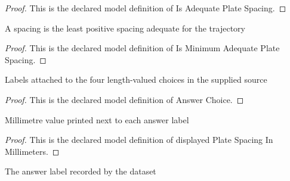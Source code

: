 \begin{proof}
  This is the declared model definition of Is Adequate Plate Spacing.
\end{proof}
\begin{definition}
  \label{def:physics:phyx-mini-0838:phyxminiproblems-problemphyxmini0838-isminimumadequateplatespacing}
  A spacing is the least positive spacing adequate for the trajectory
\end{definition}
\begin{proof}
  This is the declared model definition of Is Minimum Adequate Plate Spacing.
\end{proof}
\begin{definition}
  \label{def:physics:phyx-mini-0838:phyxminiproblems-problemphyxmini0838-answerchoice}
  Labels attached to the four length-valued choices in the supplied source
\end{definition}
\begin{proof}
  This is the declared model definition of Answer Choice.
\end{proof}
\begin{definition}
  \label{def:physics:phyx-mini-0838:phyxminiproblems-problemphyxmini0838-displayedplatespacinginmillimeters}
  Millimetre value printed next to each answer label
\end{definition}
\begin{proof}
  This is the declared model definition of displayed Plate Spacing In Millimeters.
\end{proof}
\begin{definition}
  \label{def:physics:phyx-mini-0838:phyxminiproblems-problemphyxmini0838-recordeddatasetanswer}
  The answer label recorded by the dataset
\end{definition}
